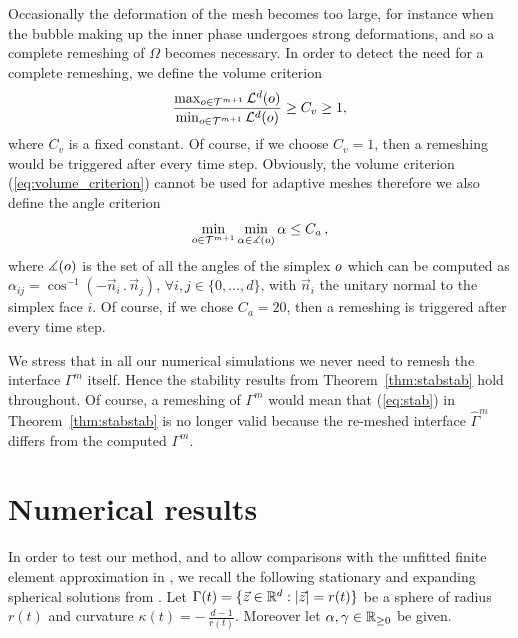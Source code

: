 Occasionally the deformation of the mesh becomes too large, for instance when
the bubble making up the inner phase undergoes strong deformations, and so a
complete remeshing of $\Omega$ becomes necessary. In order to detect the need
for a complete remeshing, we define the volume criterion
\begin{equation}\label{eq:volume_criterion}
\frac{\max_{o\in {\cal T}^{m+1}}\mathcal{L}^d(o)}
{\min_{o\in\mathcal {T}^{m+1}}\mathcal{L}^d(o)} \geq C_v \geq 1,
\end{equation}
where $C_v$ is a fixed constant. Of course, if we choose $C_v = 1$, then a
remeshing would be triggered after every time step. Obviously, the
volume criterion (\ref{eq:volume_criterion}) cannot be used for adaptive
meshes therefore we also define the angle criterion
\begin{equation}\label{eq:angle_criterion}
\min_{o\in {\cal T}^{m+1}}\min_{\alpha\in \measuredangle(o)}\alpha
\leq C_a\,,
\end{equation}
where $\measuredangle(o)$ is the set of all the angles of the simplex
$o$ which can be computed as $\alpha_{ij}=\cos^{-1}(-\vec n_i\,.\,\vec
n_j)$, $\forall i,j\in\{0,\dots,d\}$, with $\vec n_i$ the unitary normal to the
simplex face $i$. Of course, if we chose $C_a=20$\textdegree, then a remeshing
is triggered after every time step.

We stress that in all our numerical simulations we never need to remesh the
interface $\Gamma^m$ itself. Hence the stability results from
Theorem~\ref{thm:stabstab} hold throughout. Of course, a remeshing of $\Gamma^m$
would mean that (\ref{eq:stab}) in Theorem~\ref{thm:stabstab} is no longer
valid because the re-meshed interface $\hat{\Gamma}^m$ differs from the
computed $\Gamma^m$.

\section{Numerical results}\label{sec:stokes_results}
In order to test our method, and to allow comparisons with the unfitted finite
element approximation in \cite{spurious}, we recall the following stationary
and expanding spherical solutions from \cite{spurious}. Let $\Gamma(t) = \{ \vec
z \in \mathbb R^d : |\vec z| = r(t)\}$ be a sphere of radius $r(t)$ and curvature
$\kappa(t) = -\,\frac{d-1}{r(t)}$. Moreover let $\alpha,\gamma\in \mathbb R_{\geq 0}$
be given.

